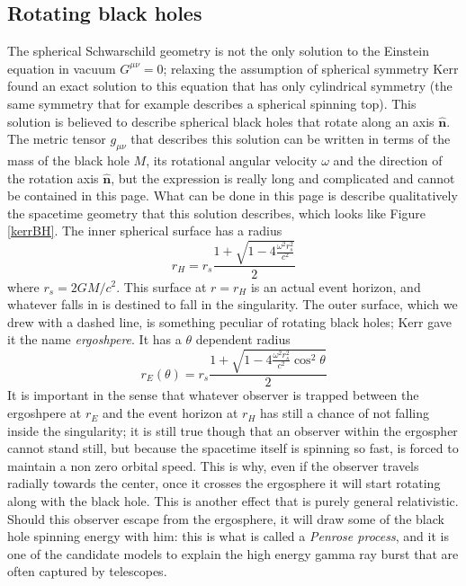 \documentclass[11pt, a4paper,oneside,openright]{book}
\numberwithin{equation}{section}
\begin{document}
\subsection{Rotating black holes}
The spherical Schwarschild geometry is not the only solution to the Einstein equation in vacuum $G^{\mu\nu}=0$; relaxing the assumption of spherical symmetry Kerr found an exact solution to this equation that has only cylindrical symmetry (the same symmetry that for example describes a spherical spinning top). This solution is believed to describe spherical black holes that rotate along an axis $\hat{\mathbf{n}}$. The metric tensor $g_{\mu\nu}$ that describes this solution can be written in terms of the mass of the black hole $M$, its rotational angular velocity $\omega$ and the direction of the rotation axis $\hat{\mathbf{n}}$, but the expression is really long and complicated and cannot be contained in this page. What can be done in this page is describe qualitatively the spacetime geometry that this solution describes, which looks like Figure \ref{kerrBH}. The inner spherical surface has a radius 
\begin{equation}
r_H = r_s\frac{1+\sqrt{1-4\frac{\omega^2r_s^2}{c^2}}}{2}  
\end{equation}
where $r_s=2GM/c^2$. This surface at $r=r_H$ is an actual event horizon, and whatever falls in is destined to fall in the singularity. The outer surface, which we drew with a dashed line, is something peculiar of rotating black holes; Kerr gave it the name \textit{ergoshpere}. It has a $\theta$ dependent radius
\begin{equation}
r_{E}(\theta) =  r_s\frac{1+\sqrt{1-4\frac{\omega^2r_s^2}{c^2}\cos^2\theta}}{2}
\end{equation}
It is important in the sense that whatever observer is trapped between the ergoshpere at $r_E$ and the event horizon at $r_H$ has still a chance of not falling inside the singularity; it is still true though that an observer within the ergospher cannot stand still, but because the spacetime itself is spinning so fast, is forced to maintain a non zero orbital speed. This is why, even if the observer travels radially towards the center, once it crosses the ergosphere it will start rotating along with the black hole. This is another effect that is purely general relativistic. Should this observer escape from the ergosphere, it will draw some of the black hole spinning energy with him: this is what is called a \textit{Penrose process}, and it is one of the candidate models to explain the high energy gamma ray burst that are often captured by telescopes.   
\end{document}
